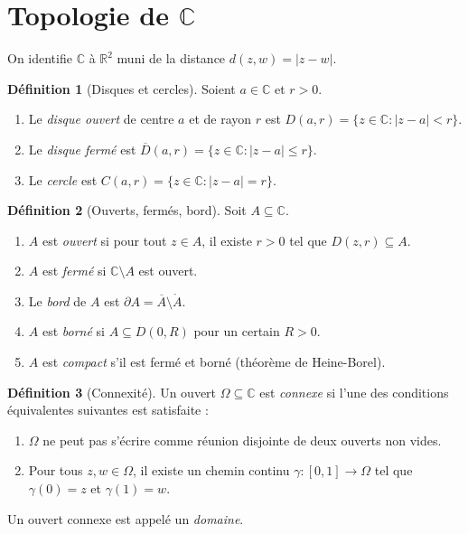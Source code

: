 \documentclass[12pt,a4paper,openany]{book}
\theoremstyle{definition}
\newtheorem{definition}{Définition}[chapter]
\theoremstyle{plain}
\theoremstyle{remark}
\newcommand{\C}{\mathbb{C}}
\newcommand{\R}{\mathbb{R}}
\newcommand{\abs}[1]{\left|#1\right|}
\newcommand{\conj}[1]{\overline{#1}}
\begin{document}
\section{Topologie de \texorpdfstring{$\C$}{C}}\label{sec:topologie-C}

On identifie $\C$ à $\R^2$ muni de la distance $d(z,w) = \abs{z - w}$.

\begin{definition}[Disques et cercles]\label{def:disques}
Soient $a \in \C$ et $r > 0$.
\begin{enumerate}[label=(\roman*)]
  \item Le \emph{disque ouvert} de centre $a$ et de rayon $r$ est $D(a,r) = \{z \in \C : \abs{z-a} < r\}$.
  \item Le \emph{disque fermé} est $\conj{D}(a,r) = \{z \in \C : \abs{z-a} \leq r\}$.
  \item Le \emph{cercle} est $C(a,r) = \{z \in \C : \abs{z-a} = r\}$.
\end{enumerate}
\end{definition}

\begin{definition}[Ouverts, fermés, bord]\label{def:ouverts-fermes}
Soit $A \subseteq \C$.
\begin{enumerate}[label=(\roman*)]
  \item $A$ est \emph{ouvert} si pour tout $z \in A$, il existe $r > 0$ tel que $D(z,r) \subseteq A$.
  \item $A$ est \emph{fermé} si $\C \setminus A$ est ouvert.
  \item Le \emph{bord} de $A$ est $\partial A = \conj{A} \setminus \mathring{A}$.
  \item $A$ est \emph{borné} si $A \subseteq D(0,R)$ pour un certain $R > 0$.
  \item $A$ est \emph{compact} s'il est fermé et borné (théorème de Heine-Borel).
\end{enumerate}
\end{definition}

\begin{definition}[Connexité]\label{def:connexite}
Un ouvert $\Omega \subseteq \C$ est \emph{connexe} si l'une des conditions équivalentes suivantes est satisfaite :
\begin{enumerate}[label=(\roman*)]
  \item $\Omega$ ne peut pas s'écrire comme réunion disjointe de deux ouverts non vides.
  \item Pour tous $z, w \in \Omega$, il existe un chemin continu $\gamma : [0,1] \to \Omega$ tel que $\gamma(0) = z$ et $\gamma(1) = w$.
\end{enumerate}
Un ouvert connexe est appelé un \emph{domaine}.
\end{definition}
\end{document}
